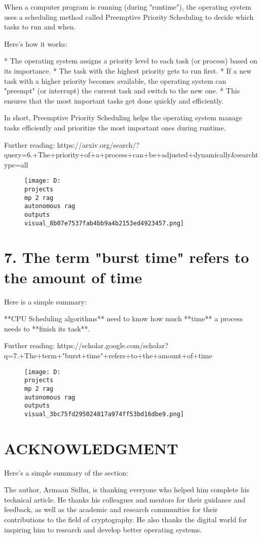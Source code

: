 \documentclass[12pt,a4paper]{article}
\begin{document}
When a computer program is running (during "runtime"), the operating system uses a scheduling method called Preemptive Priority Scheduling to decide which tasks to run and when.

Here's how it works:

* The operating system assigns a priority level to each task (or process) based on its importance.
* The task with the highest priority gets to run first.
* If a new task with a higher priority becomes available, the operating system can "preempt" (or interrupt) the current task and switch to the new one.
* This ensures that the most important tasks get done quickly and efficiently.

In short, Preemptive Priority Scheduling helps the operating system manage tasks efficiently and prioritize the most important ones during runtime.

Further reading: https://arxiv.org/search/?query=6.+The+priority+of+a+process+can+be+adjusted+dynamically&searchtype=all
\begin{figure}[h]
\centering
\texttt{[image: D:\\projects\\mp 2 rag\\autonomous rag\\outputs\\visual\_8b07e7537fab4bb9a4b2153ed4923457.png]}
\end{figure}
\section{7. The term "burst time" refers to the amount of time}
Here is a simple summary:

**CPU Scheduling algorithms** need to know how much **time** a process needs to **finish its task**.

Further reading: https://scholar.google.com/scholar?q=7.+The+term+"burst+time"+refers+to+the+amount+of+time
\begin{figure}[h]
\centering
\texttt{[image: D:\\projects\\mp 2 rag\\autonomous rag\\outputs\\visual\_3bc75fd295024817a974ff53bd16dbe9.png]}
\end{figure}
\section{ACKNOWLEDGMENT}
Here's a simple summary of the section:

The author, Armaan Sidhu, is thanking everyone who helped him complete his technical article. He thanks his colleagues and mentors for their guidance and feedback, as well as the academic and research communities for their contributions to the field of cryptography. He also thanks the digital world for inspiring him to research and develop better operating systems.
\end{document}
